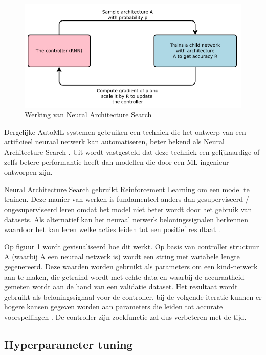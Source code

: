 \begin{figure}
    \includegraphics[width=\linewidth]{img/nas.png}
    \caption{Werking van Neural Architecture Search  \autocite{ZophL2016}}
    \label{fig:nas}
\end{figure}

Dergelijke AutoML systemen gebruiken een techniek die het ontwerp van een artificieel neuraal netwerk kan automatiseren, beter bekend als Neural Architecture Search \autocite{Elsken2019}. Uit \textcite{ZophL2016} wordt vastgesteld dat deze techniek een gelijkaardige of zelfs betere performantie heeft dan modellen die door een ML-ingenieur ontworpen zijn.

Neural Architecture Search gebruikt Reinforcement Learning om een model te trainen. Deze manier van werken is fundamenteel anders dan gesuperviseerd / ongesuperviseerd leren omdat het model niet beter wordt door het gebruik van datasets. Als alternatief kan het neuraal netwerk beloningssignalen herkennen waardoor het kan leren welke acties leiden tot een positief resultaat \autocite{Lievens2019}.

Op figuur \ref{fig:nas} wordt gevisualiseerd hoe dit werkt. Op basis van controller structuur A (waarbij A een neuraal netwerk is) wordt een string met variabele lengte gegenereerd. Deze waarden worden gebruikt als parameters om een kind-netwerk aan te maken, die getraind wordt met echte data en waarbij de accuraatheid gemeten wordt aan de hand van een validatie dataset. Het resultaat wordt gebruikt als beloningssignaal voor de controller, bij de volgende iteratie kunnen er hogere kansen gegeven worden aan parameters die leiden tot accurate voorspellingen \autocite{ZophL2016}. De controller zijn zoekfunctie zal dus verbeteren met de tijd.

\subsection{Hyperparameter tuning}

